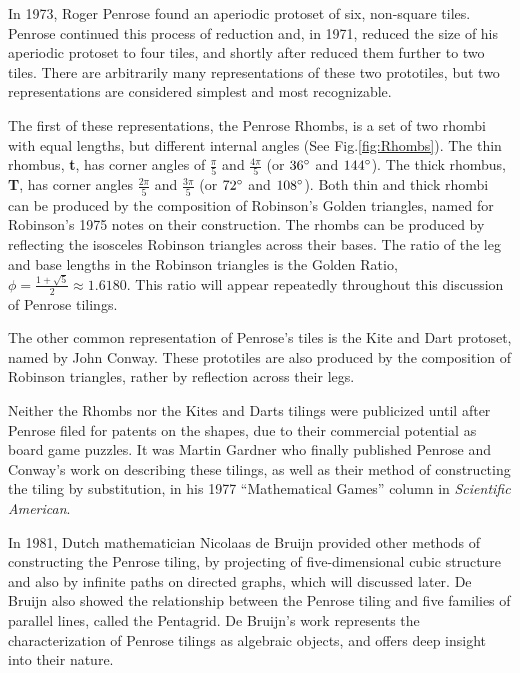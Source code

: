 \documentclass[
  oneside,
  11pt, a4paper,
  footinclude=true,
  headinclude=true,
  cleardoublepage=empty
]{scrbook}
\begin{document}
In 1973, Roger Penrose found an aperiodic protoset of six, non-square tiles.  Penrose continued this process of reduction and, in 1971, reduced the size of his aperiodic protoset to four tiles, and shortly after reduced them further to two tiles. There are arbitrarily many representations of these two prototiles, but two representations are considered simplest and most recognizable. 

The first of these representations, the Penrose Rhombs, is a set of two rhombi with equal lengths, but different internal angles (See Fig.\ref{fig:Rhombs}). The thin rhombus, \textbf{t}, has corner angles of $\frac{\pi}{5}$ and $\frac{4 \pi}{5}$ (or $36 \degree$ and $144 \degree$). The thick rhombus, \textbf{T}, has corner angles  $\frac{2 \pi}{5}$ and $\frac{3 \pi}{5}$ (or $72 \degree$ and $108 \degree$). Both thin and thick rhombi can be produced by the composition of Robinson's Golden triangles, named for Robinson's 1975 notes on their construction. The rhombs can be produced by reflecting the isosceles Robinson triangles across their bases. The ratio of the leg and base lengths in the Robinson triangles is the Golden Ratio, \textbf{ $\phi= \frac{1+\sqrt{5}}{2}\approx 1.6180$}. This ratio will appear repeatedly throughout this discussion of Penrose tilings. 

The other common representation of Penrose's tiles is the Kite and Dart protoset, named by John Conway. These prototiles are also produced by the composition of Robinson triangles, rather by reflection across their legs. 

Neither the Rhombs nor the Kites and Darts tilings were publicized until after Penrose filed for patents on the shapes, due to their commercial potential as board game puzzles. It was Martin Gardner who finally published Penrose and Conway's work on describing these tilings, as well as their method of constructing the tiling by substitution, in his 1977 ``Mathematical Games'' column in \textit{Scientific American}. 

In 1981, Dutch mathematician Nicolaas de Bruijn provided other methods of constructing the Penrose tiling, by projecting of five-dimensional cubic structure and also by infinite paths on directed graphs, which will discussed later. De Bruijn also showed the relationship between the Penrose tiling and five families of parallel lines, called the Pentagrid. De Bruijn's work represents the characterization of Penrose tilings as algebraic objects, and offers deep insight into their nature. 
\end{document}

